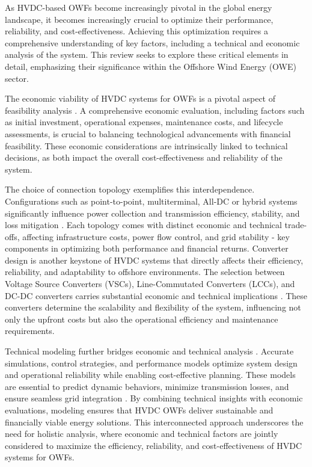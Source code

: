 \documentclass{ieeeaccess}
\begin{document}
As HVDC-based OWFs become increasingly pivotal in the global energy landscape, it becomes increasingly crucial to optimize their performance, reliability, and cost-effectiveness. Achieving this optimization requires a comprehensive understanding of key factors, including a technical and economic analysis of the system. This review seeks to explore these critical elements in detail, emphasizing their significance within the Offshore Wind Energy (OWE) sector. 

The economic viability of HVDC systems for OWFs is a pivotal aspect of feasibility analysis \cite{jiang2022tech}. A comprehensive economic evaluation, including factors such as initial investment, operational expenses, maintenance costs, and lifecycle assessments, is crucial to balancing technological advancements with financial feasibility. These economic considerations are intrinsically linked to technical decisions, as both impact the overall cost-effectiveness and reliability of the system.

The choice of connection topology exemplifies this interdependence. Configurations such as point-to-point, multiterminal, All-DC or hybrid systems significantly influence power collection and transmission efficiency, stability, and loss mitigation \cite{elahidoost2024stability, paul2022novel}. 
Each topology comes with distinct economic and technical trade-offs, affecting infrastructure costs, power flow control, and grid stability - key components in optimizing both performance and financial returns. Converter design is another keystone of HVDC systems that directly affects their efficiency, reliability, and adaptability to offshore environments. The selection between Voltage Source Converters (VSCs), Line-Commutated Converters (LCCs), and DC-DC converters carries substantial economic and technical implications \cite{korompili2016review, inamdar2018converters}. These converters determine the scalability and flexibility of the system, influencing not only the upfront costs but also the operational efficiency and maintenance requirements.

Technical modeling further bridges economic and technical analysis \cite{abedin2021dynamic, xia2023operation}. Accurate simulations, control strategies, and performance models optimize system design and operational reliability while enabling cost-effective planning. These models are essential to predict dynamic behaviors, minimize transmission losses, and ensure seamless grid integration \cite{wang2022large}. By combining technical insights with economic evaluations, modeling ensures that HVDC OWFs deliver sustainable and financially viable energy solutions. This interconnected approach underscores the need for holistic analysis, where economic and technical factors are jointly considered to maximize the efficiency, reliability, and cost-effectiveness of HVDC systems for OWFs.
\end{document}
